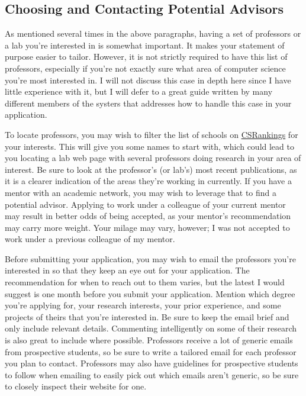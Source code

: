 \documentclass[12pt]{article}
\begin{document}
\subsection{Choosing and Contacting Potential Advisors}

As mentioned several times in the above paragraphs, having a set of professors or a lab you're interested in is somewhat important. It makes your statement of purpose easier to tailor. However, it is not strictly required to have this list of professors, especially if you're not exactly sure what area of computer science you're most interested in. I will not discuss this case in depth here since I have little experience with it, but I will defer to a great guide written by many different members of the systers that addresses how to handle this case in your application. \cite{systerssop}

To locate professors, you may wish to filter the list of schools on \href{https://csrankings.org}{CSRankings} for your interests. This will give you some names to start with, which could lead to you locating a lab web page with several professors doing research in your area of interest. Be sure to look at the professor's (or lab's) most recent publications, as it is a clearer indication of the areas they're working in currently. If you have a mentor with an academic network, you may wish to leverage that to find a potential advisor. Applying to work under a colleague of your current mentor may result in better odds of being accepted, as your mentor's recommendation may carry more weight. Your milage may vary, however; I was not accepted to work under a previous colleague of my mentor.

Before submitting your application, you may wish to email the professors you're interested in so that they keep an eye out for your application. The recommendation for when to reach out to them varies, but the latest I would suggest is one month before you submit your application. \cite{mightgradguide} Mention which degree you're applying for, your research interests, your prior experience, and some projects of theirs that you're interested in. Be sure to keep the email brief and only include relevant details. Commenting intelligently on some of their research is also great to include where possible. Professors receive a lot of generic emails from prospective students, so be sure to write a tailored email for each professor you plan to contact. Professors may also have guidelines for prospective students to follow when emailing to easily pick out which emails aren't generic, so be sure to closely inspect their website for one.
\end{document}
